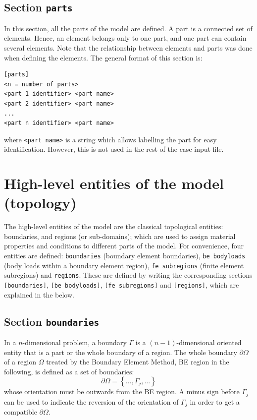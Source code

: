 \documentclass[a4paper,fleqn]{book}
\begin{document}
\subsection{Section \texttt{parts}}

In this section, all the parts of the model are defined. A part is a connected set of elements. Hence, an element belongs only to one part, and one part can contain several elements. Note that the relationship between elements and parts was done when defining the elements. The general format of this section is:
\begin{Verbatim}[frame=single, fontsize=\small, label={general format of section [parts]}]
[parts]
<n = number of parts>
<part 1 identifier> <part name> 
<part 2 identifier> <part name> 
...
<part n identifier> <part name> 
\end{Verbatim} 
where \texttt{<part name>} is a string which allows labelling the part for easy identification. However, this is not used in the rest of the case input file.

\section{High-level entities of the model (topology)}

The high-level entities of the model are the classical topological entities: boundaries, and regions (or sub-domains); which are used to assign material properties and conditions to different parts of the model. For convenience, four entities are defined: \texttt{boundaries} (boundary element boundaries), \texttt{be bodyloads} (body loads within a boundary element region), \texttt{fe subregions} (finite element subregions) and \texttt{regions}. These are defined by writing the corresponding sections \texttt{[boundaries]}, \texttt{[be bodyloads]}, \texttt{[fe subregions]} and \texttt{[regions]}, which are explained in the below.

\subsection{Section \texttt{boundaries}}

In a $n$-dimensional problem, a boundary $\Gamma$ is a $(n-1)$-dimensional oriented entity that is a part or the whole boundary of a region. The whole boundary $\partial\Omega$ of a region $\Omega$ treated by the Boundary Element Method, BE region in the following, is defined as a set of boundaries:
\begin{equation}
\partial\Omega = \left\{\ldots,\Gamma_j,\ldots\right\}
\end{equation}
whose orientation must be outwards from the BE region. A minus sign before $\Gamma_j$ can be used to indicate the reversion of the orientation of $\Gamma_j$ in order to get a compatible $\partial\Omega$. 
\end{document}
